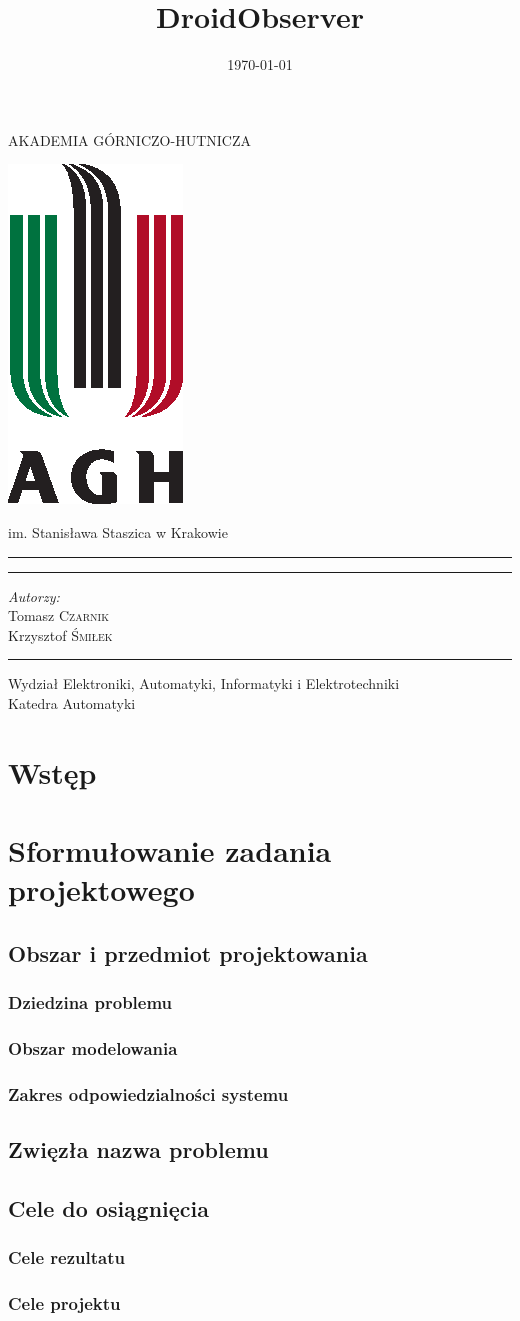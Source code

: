 \documentclass[11pt,a4paper]{article}
\title{DroidObserver}
\date{\today}
\makeatletter
\renewcommand{\maketitle}{
\begin{titlepage}
\begin{center}

\LARGE{AKADEMIA GÓRNICZO-HUTNICZA}

\vspace*{1cm}
\includegraphics[scale=1.8]{agh.eps}
\vspace*{1cm}

\LARGE{im. Stanisława Staszica w Krakowie}

\rule{\textwidth}{0.4mm}
\LARGE \textsc{\@title}
\rule{\textwidth}{0.4mm}

\vspace*{5mm}


\large
\emph{Autorzy:}\\
Tomasz \textsc{Czarnik}\\
Krzysztof \textsc{Śmiłek}\\

\vfill
\vspace*{\stretch{8}}
\rule{\textwidth}{0.4mm}

\large{Wydział Elektroniki, Automatyki, Informatyki i Elektrotechniki}\\
\large{Katedra Automatyki}\\
\vspace*{\stretch{7}}
\@date

\end{center}

\end{titlepage}
}
\makeatother
\begin{document}
\maketitle

\newpage

\tableofcontents

\newpage

\section{Wstęp}

\cite{2009UltraDeponti}
\cite{2010ComputingEttinger}
\cite{2011IEEEIntGoldman}
\cite{2011IEEERadioMitchell}
\cite{2009IEEEEngineeringSposaro}
\cite{2011DroidColunas}
\cite{2010IEEEEMBCDoukas}
\cite{2010IEEEEMBCSposaro}
\cite{2009IEEEBIBEWang}
\cite{2010NISSYang}
\cite{2010AndroidHashimi}

\section {Sformułowanie zadania projektowego}
\subsection {Obszar i przedmiot projektowania}
\subsubsection {Dziedzina problemu}
\subsubsection {Obszar modelowania}
\subsubsection {Zakres odpowiedzialności systemu}
\subsection {Zwięzła nazwa problemu}
\subsection {Cele do osiągnięcia}
\subsubsection {Cele rezultatu}
\subsubsection {Cele projektu}
\end{document}
